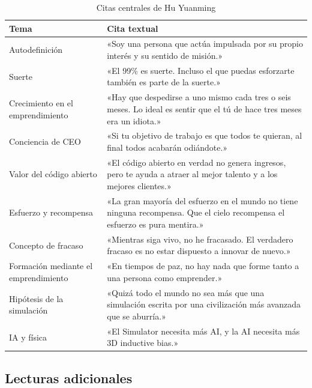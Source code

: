 \documentclass[a4paper]{article}
\begin{document}
\begin{table}[H]
\centering
\caption{Citas centrales de Hu Yuanming}
\begin{tabular}{p{3.5cm}p{10cm}}
\toprule
\textbf{Tema} & \textbf{Cita textual} \\
\midrule
Autodefinición & «Soy una persona que actúa impulsada por su propio interés y su sentido de misión.» \\
\midrule
Suerte & «El 99\% es suerte. Incluso el que puedas esforzarte también es parte de la suerte.» \\
\midrule
Crecimiento en el emprendimiento & «Hay que despedirse a uno mismo cada tres o seis meses. Lo ideal es sentir que el tú de hace tres meses era un idiota.» \\
\midrule
Conciencia de CEO & «Si tu objetivo de trabajo es que todos te quieran, al final todos acabarán odiándote.» \\
\midrule
Valor del código abierto & «El código abierto en verdad no genera ingresos, pero te ayuda a atraer al mejor talento y a los mejores clientes.» \\
\midrule
Esfuerzo y recompensa & «La gran mayoría del esfuerzo en el mundo no tiene ninguna recompensa. Que el cielo recompensa el esfuerzo es pura mentira.» \\
\midrule
Concepto de fracaso & «Mientras siga vivo, no he fracasado. El verdadero fracaso es no estar dispuesto a innovar de nuevo.» \\
\midrule
Formación mediante el emprendimiento & «En tiempos de paz, no hay nada que forme tanto a una persona como emprender.» \\
\midrule
Hipótesis de la simulación & «Quizá todo el mundo no sea más que una simulación escrita por una civilización más avanzada que se aburría.» \\
\midrule
IA y física & «El Simulator necesita más AI, y la AI necesita más 3D inductive bias.» \\
\bottomrule
\end{tabular}
\end{table}

\subsection{Lecturas adicionales}
\end{document}
